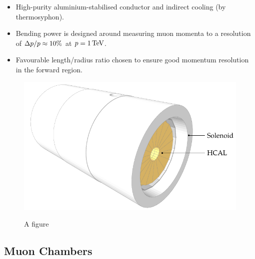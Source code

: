 \begin{itemize}
    \item High-purity aluminium-stabilised conductor and indirect cooling (by
        thermosyphon).
    \item Bending power is designed around measuring muon momenta to a
        resolution of ${\Delta p/p\approx 10\%}$ at ${p = \SI{1}{TeV}}$.
    \item Favourable length/radius ratio chosen to ensure good momentum
        resolution in the forward region.
\end{itemize}

\begin{figure}[htbp]
    \centering
    \includegraphics{diagrams/tikz/cms/annotated/cms_magnet.pdf}
    \label{fig:cms-magnet}
    \caption{
        A figure 
    }
\end{figure}

\subsection{Muon Chambers}

